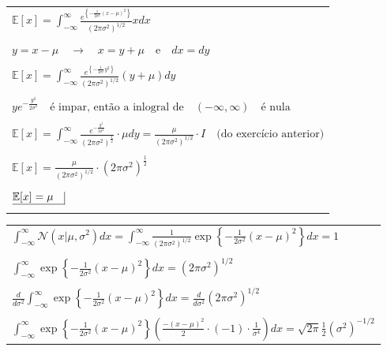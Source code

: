\begin{enumerate}
\begin{tabular}{l}
    $\mathbb{E}[x]=\int_{-\infty}^{\infty} \frac{e^{\left\{-\frac{1}{2 \sigma^2}(x-\mu)^2\right\}}}{\left(2 \pi \sigma^2\right)^{1/2}} x d x$ \\
    \\
    $y=x-\mu \quad \rightarrow \quad x=y+\mu \quad \text{e} \quad d x=d y$ \\
    \\
    $\mathbb{E}[x]=\int_{-\infty}^{\infty} \frac{e^{\left\{-\frac{1}{2 \sigma^2} y^2\right\}}}{\left(2 \pi \sigma^2\right)^{1 / 2}}(y+\mu) d y$ \\
    \\
    $y e^{-\frac{y^2}{2 \sigma^2}} \quad \text{é impar, então a inlogral de} \quad(-\infty, \infty) \quad \text {é nula}$ \\
    \\
    $\mathbb{E}[x]=\int_{-\infty}^{\infty} \frac{e^{-\frac{y^2}{2 \sigma^2}}}{\left(2 \pi \sigma^2\right)^{\frac{1}{2}}} \cdot \mu d y=\frac{\mu}{\left(2 \pi \sigma^2\right)^{1 / 2}} \cdot I \quad \text{(do exercício anterior)}$ \\
    \\
    $\mathbb{E}[x]=\frac{\mu}{\left(2 \pi \sigma^2\right)^{1 / 2}} \cdot\left(2 \pi \sigma^2\right)^{\frac{1}{2}}$\\
    \\
    $\underline{\mathbb{E}[x]=\mu \quad} \vline$\\
    \\
\end{tabular}
\newline
\begin{tabular}{l}
    $ \int_{-\infty}^{\infty}\mathcal{N}(x | \mu, \sigma^2)dx=  \int_{-\infty}^{\infty} \frac{1}{(2\pi\sigma^2)^{1/2}}\exp\left\{ -\frac{1}{2\sigma^2}(x - \mu)^2 \right\} dx = 1 $\\
    \\
    $ \int_{-\infty}^{\infty} \exp\left\{ -\frac{1}{2\sigma^2}(x - \mu)^2 \right\} dx = (2\pi\sigma^2)^{1/2} $\\
    \\
    $ \frac{d}{d \sigma^2} \int_{-\infty}^{\infty} \exp\left\{ -\frac{1}{2\sigma^2}(x - \mu)^2 \right\} dx = \frac{d}{d \sigma^2} (2\pi\sigma^2)^{1/2} $\\
    \\
    $ \int_{-\infty}^{\infty} \exp\left\{ -\frac{1}{2\sigma^2}(x - \mu)^2 \right\} \left( \frac{-(x-\mu)^2}{2} \cdot (-1) \cdot \frac{1}{\sigma^4} \right) dx = \sqrt{2\pi}\frac{1}{2}(\sigma^2)^{-1/2} $\\

\end{tabular}
\end{enumerate}
